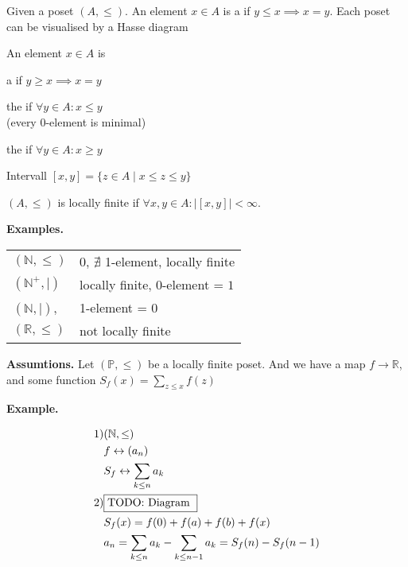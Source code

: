 \begin{definition}
Given a poset $(A, \leq)$. 
An element $x \in A$ is a  if $y \leq x \implies x=y$. 
Each poset can be visualised by a Hasse diagram


An element $x \in A$ is 
\begin{compactitem}
  \item a  if $y \geq x \implies x=y$
  \item the  if $\forall y \in A : x \leq y$ \\
    (every 0-element is minimal)
  \item the  if $\forall y \in A : x \geq y$
\end{compactitem}

Intervall $[x,y] = \{z \in A \mid x \leq z \leq y\}$

$(A, \leq)$ is locally finite if $\forall x,y \in A: | [x,y]| < \infty$. 
\end{definition}

\textbf{Examples.} \\
\begin{tabular}{ll}
  $(\mathbb{N}, \leq)$ 
    & 0, $\nexists$ 1-element, locally finite \\
  $(\mathbb{N}^{+}, \mid)$
    & locally finite, 0-element = $1$ \\
  $(\mathbb{N}, \mid)$, 
    & 1-element = $0$ \\
  $(\mathbb{R}, \leq)$ 
    & not locally finite
\end{tabular}

\textbf{Assumtions.}
Let $(\mathbb{P}, \leq)$ be a locally finite poset. And we have a map $f \rightarrow \mathbb{R}$, and some function $S_f(x) = \sum_{z \leq x} f(z)$

\textbf{Example.}

\begin{align*}
  \text{1)} 
    & (\mathbb{N}, \leq) \\
    & f \leftrightarrow (a_n) \\
    & S_f \leftrightarrow \sum_{k\leq n} a_k \\
  \text{2)} & \fbox{TODO: Diagram } \\
    & S_f(x) = f(0) + f(a) + f(b) + f(x) \\
    & a_n = \sum_{k \leq n} a_k - \sum_{k \leq n-1} a_k = S_f(n) - S_f(n-1)
\end{align*}

